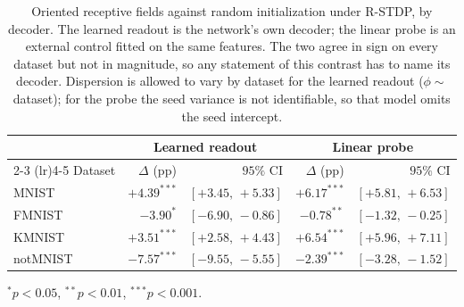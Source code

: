 \begin{table}[t]
\centering
\caption{Oriented receptive fields against random initialization under R-STDP, by
decoder. The learned readout is the network's own decoder; the linear probe is an
external control fitted on the same features. The two agree in sign on every dataset but
not in magnitude, so any statement of this contrast has to name its decoder. Dispersion
is allowed to vary by dataset for the learned readout ($\phi \sim$ dataset); for the probe
the seed variance is not identifiable, so that model omits the seed intercept.}
\label{tab:phase2_prior}
\begin{tabular}{lrrrr}
\toprule
& \multicolumn{2}{c}{Learned readout} & \multicolumn{2}{c}{Linear probe} \\
\cmidrule(lr){2-3} \cmidrule(lr){4-5}
Dataset & $\Delta$ (pp) & $95\%$ CI & $\Delta$ (pp) & $95\%$ CI \\
\midrule
MNIST & $+4.39^{***}$ & $[+3.45,\, +5.33]$ & $+6.17^{***}$ & $[+5.81,\, +6.53]$ \\
FMNIST & $-3.90^{*}$ & $[-6.90,\, -0.86]$ & $-0.78^{**}$ & $[-1.32,\, -0.25]$ \\
KMNIST & $+3.51^{***}$ & $[+2.58,\, +4.43]$ & $+6.54^{***}$ & $[+5.96,\, +7.11]$ \\
notMNIST & $-7.57^{***}$ & $[-9.55,\, -5.55]$ & $-2.39^{***}$ & $[-3.28,\, -1.52]$ \\
\bottomrule
\end{tabular}

\footnotesize $^{*}p<0.05$, $^{**}p<0.01$, $^{***}p<0.001$.
\end{table}
